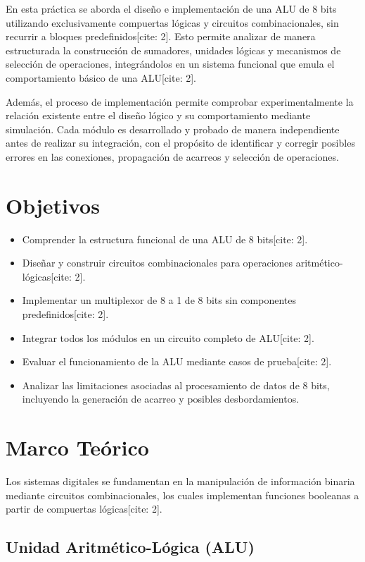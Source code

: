 \documentclass[12pt,a4paper]{article}
\begin{document}
En esta práctica se aborda el diseño e implementación de una ALU de 8 bits utilizando exclusivamente compuertas lógicas y circuitos combinacionales, sin recurrir a bloques predefinidos[cite: 2]. Esto permite analizar de manera estructurada la construcción de sumadores, unidades lógicas y mecanismos de selección de operaciones, integrándolos en un sistema funcional que emula el comportamiento básico de una ALU[cite: 2].

Además, el proceso de implementación permite comprobar experimentalmente la relación existente entre el diseño lógico y su comportamiento mediante simulación. Cada módulo es desarrollado y probado de manera independiente antes de realizar su integración, con el propósito de identificar y corregir posibles errores en las conexiones, propagación de acarreos y selección de operaciones.

\section{Objetivos}

\begin{itemize}
    \item Comprender la estructura funcional de una ALU de 8 bits[cite: 2].
    \item Diseñar y construir circuitos combinacionales para operaciones aritmético-lógicas[cite: 2].
    \item Implementar un multiplexor de 8 a 1 de 8 bits sin componentes predefinidos[cite: 2].
    \item Integrar todos los módulos en un circuito completo de ALU[cite: 2].
    \item Evaluar el funcionamiento de la ALU mediante casos de prueba[cite: 2].
    \item Analizar las limitaciones asociadas al procesamiento de datos de 8 bits, incluyendo la generación de acarreo y posibles desbordamientos.
\end{itemize}

\section{Marco Teórico}

Los sistemas digitales se fundamentan en la manipulación de información binaria mediante circuitos combinacionales, los cuales implementan funciones booleanas a partir de compuertas lógicas[cite: 2]. 

\subsection{Unidad Aritmético-Lógica (ALU)}
\end{document}

